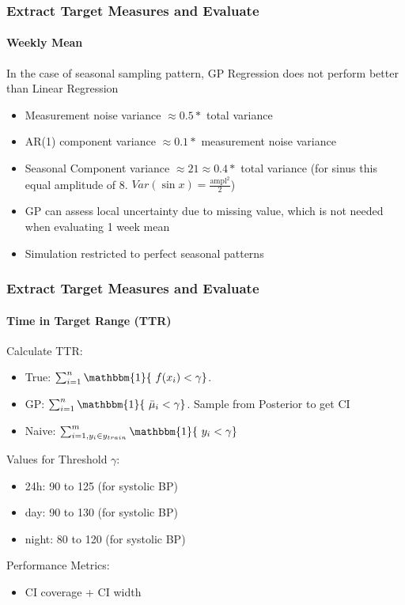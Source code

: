 \documentclass[
	8pt, %
]{beamer}
\begin{document}
\begin{frame}
	\frametitle{Extract Target Measures and Evaluate}
	\framesubtitle{Weekly Mean} %

	In the case of seasonal sampling pattern, GP Regression does not perform better than Linear Regression

	\begin{itemize}
		\item Measurement noise variance $\approx 0.5 *$ total variance
		\item AR(1) component variance $\approx 0.1 *$ measurement noise variance
		\item Seasonal Component variance $\approx 21 \approx 0.4 *$ total variance (for sinus this equal amplitude of 8. $Var(\sin{x}) = \frac{\text{ampl}^2}{2}$)
		\item GP can assess local uncertainty due to missing value, which is not needed when evaluating 1 week mean
		\item Simulation restricted to perfect seasonal patterns
	\end{itemize}

\end{frame}




\begin{frame}
	\frametitle{Extract Target Measures and Evaluate}
	\framesubtitle{Time in Target Range (TTR)} %

	Calculate TTR:
	\begin{itemize}
			\item True: $\sum_{i=1}^{n} \mathbbm{1}\{\ f(x_i) < \gamma \}$.
			\item GP: $\sum_{i=1}^{n} \mathbbm{1}\{\ \bar{\mu}_i < \gamma \}$. Sample from Posterior to get CI
			\item Naive: $\sum_{i=1, y_i \in y_{train}}^{m} \mathbbm{1}\{\ y_i < \gamma \}$
	\end{itemize}


	\bigskip

	Values for Threshold $\gamma$:
	\begin{itemize}
		\item 24h: 90 to 125 (for systolic BP)
		\item day: 90 to 130 (for systolic BP)
		\item night: 80 to 120 (for systolic BP)
	\end{itemize}

	Performance Metrics:
	\begin{itemize}
		\item CI coverage + CI width
	\end{itemize}

\end{frame}
\end{document}
